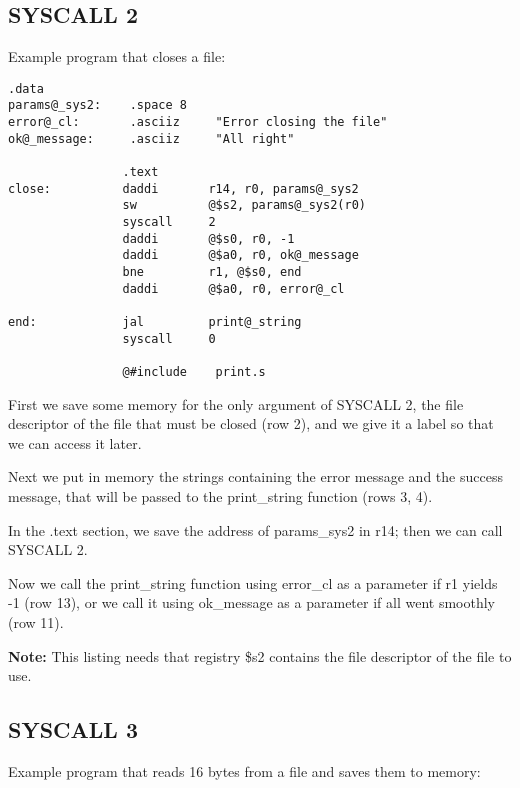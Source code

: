 \documentclass[letterpaper,10pt,english]{sphinxmanual}
\begin{document}
\subsection{SYSCALL 2}
\label{examples:syscall-2}
Example program that closes a file:

\begin{Verbatim}[commandchars=@\[\]]
                .data
params@_sys2:    .space 8
error@_cl:       .asciiz     "Error closing the file"
ok@_message:     .asciiz     "All right"

                .text
close:          daddi       r14, r0, params@_sys2
                sw          @$s2, params@_sys2(r0)
                syscall     2
                daddi       @$s0, r0, -1
                daddi       @$a0, r0, ok@_message
                bne         r1, @$s0, end
                daddi       @$a0, r0, error@_cl

end:            jal         print@_string
                syscall     0

                @#include    print.s
\end{Verbatim}

First we save some memory for the only argument of SYSCALL 2, the file descriptor
of the file that must be closed (row 2), and we give it a label so that we can
access it later.

Next we put in memory the strings containing the error message and the success
message, that will be passed to the print\_string function (rows 3, 4).

In the .text section, we save the address of params\_sys2 in r14; then we can
call SYSCALL 2.

Now we call the print\_string function using error\_cl as a parameter if r1
yields -1 (row 13), or we call it using ok\_message as a parameter if all went
smoothly (row 11).

\textbf{Note:} This listing needs that registry \$s2 contains the
file descriptor of the file to use.


\subsection{SYSCALL 3}
\label{examples:syscall-3}
Example program that reads 16 bytes from a file and saves them to memory:
\end{document}
